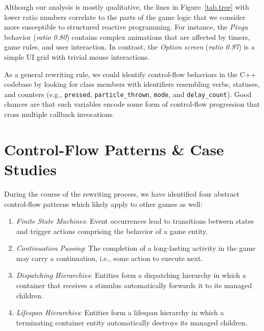 \documentclass{vgtc}                          %
\newcommand{\code}[1] {{\small{\texttt{#1}}}}
\begin{document}
Although our analysis is mostly qualitative, the lines in Figure~\ref{tab.tree}
with lower ratio numbers correlate to the parts of the game logic that we
consider more susceptible to structured reactive programming.
For instance, the \emph{Pingu} behavior (\emph{ratio 0.80}) contains complex
animations that are affected by timers, game rules, and user interaction.
In contrast, the \emph{Option screen} (\emph{ratio 0.97}) is a simple UI grid
with trivial mouse interactions.

As a general rewriting rule, we could identify control-flow behaviors in the
C++ codebase by looking for class members with identifiers resembling verbs,
statuses, and counters (e.g.,
\code{pressed},
\code{particle\_thrown},
\code{mode}, and
\code{delay\_count}).
Good chances are that such variables encode some form of control-flow
progression that cross multiple callback invocations.

\section{Control-Flow Patterns \& Case Studies}
\label{sec.pats}

During the course of the rewriting process, we have identified four abstract
control-flow patterns which likely apply to other games as well:

\begin{enumerate}
\item \emph{Finite State Machines}:
    Event occurrences lead to transitions between states and trigger actions
    comprising the behavior of a game entity.
\item \emph{Continuation Passing}:
    The completion of a long-lasting activity in the game may carry a
    continuation, i.e., some action to execute next.
\item \emph{Dispatching Hierarchies}:
    Entities form a dispatching hierarchy in which a container that receives a
    stimulus automatically forwards it to its managed children.
\item \emph{Lifespan Hierarchies}:
    Entities form a lifespan hierarchy in which a terminating container entity
    automatically destroys its managed children.
\end{enumerate}
\end{document}

